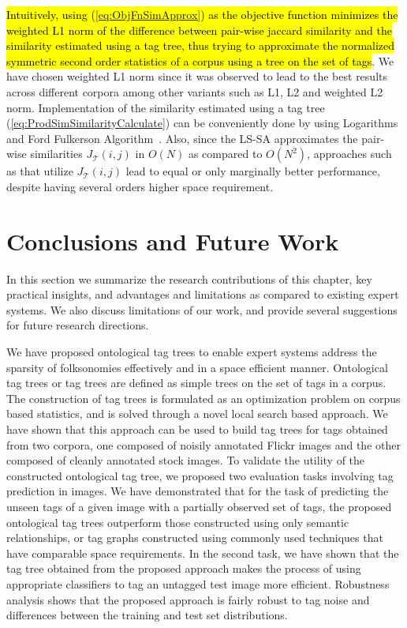 \hl{Intuitively, using ({\ref{eq:ObjFnSimApprox}}) as the objective function minimizes the weighted L1 norm of the difference between pair-wise jaccard similarity and the similarity estimated using a tag tree, thus trying to approximate the normalized symmetric second order statistics of a corpus using a tree on the set of tags}. We have chosen weighted L1 norm since it was observed to lead to the best results across different corpora among other variants such as L1, L2 and weighted L2 norm. Implementation of the similarity estimated using a tag tree (\ref{eq:ProdSimSimilarityCalculate}) can be conveniently done by using Logarithms and Ford Fulkerson Algorithm~\cite{ford2010flows}. Also, since the LS-SA approximates the pair-wise similarities $J_{\mathcal{T}}(i,j)$ in $O(N)$ as compared to $O(N^2)$, approaches such as {\cite{sigurbjornsson2008flickr}} that utilize $J_{\mathcal{T}}(i,j)$ lead to equal or only marginally better performance, despite having several orders higher space requirement. \\


\section{Conclusions and Future Work}

In this section we summarize the research contributions of this chapter, key practical insights, and advantages and limitations as compared to existing expert systems. We also discuss limitations of our work, and provide several suggestions for future research directions. 

We have proposed ontological tag trees to enable expert systems address the sparsity of folksonomies effectively and in a space efficient manner. Ontological tag trees or tag trees are defined as simple trees on the set of tags in a corpus. The construction of tag trees is formulated as an optimization problem on corpus based statistics, and is solved through a novel local search based approach. We have shown that this approach can be used to build tag trees for tags obtained from two corpora, one composed of noisily annotated Flickr images and the other composed of cleanly annotated stock images. To validate the utility of the constructed ontological tag tree, we proposed two evaluation tasks involving tag prediction in images.  We have demonstrated that for the task of predicting the unseen tags of a given image with a partially observed set of tags, the proposed ontological tag trees outperform those constructed using only semantic relationships, or tag graphs constructed using commonly used techniques that have comparable space requirements. In the second task, we have shown that the tag tree obtained from the proposed approach makes the process of using appropriate classifiers to tag an untagged test image more efficient. Robustness analysis shows that the proposed approach is fairly robust to tag noise and differences between the training and test set distributions.

